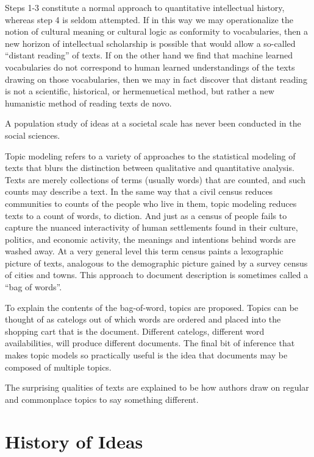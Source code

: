 \documentclass[]{book}
\begin{document}
Steps 1-3 constitute a normal approach to quantitative intellectual
history, whereas step 4 is seldom attempted. If in this way we may
operationalize the notion of cultural meaning or cultural logic as
conformity to vocabularies, then a new horizon of intellectual
scholarship is possible that would allow a so-called ``distant reading''
of texts. If on the other hand we find that machine learned vocabularies
do not correspond to human learned understandings of the texts drawing
on those vocabularies, then we may in fact discover that distant reading
is not a scientific, historical, or hermenuetical method, but rather a
new humanistic method of reading texts de novo.

A population study of ideas at a societal scale has never been conducted
in the social sciences.

Topic modeling refers to a variety of approaches to the statistical
modeling of texts that blurs the distinction between qualitative and
quantitative analysis. Texts are merely collections of terms (usually
words) that are counted, and such counts may describe a text. In the
same way that a civil census reduces communities to counts of the people
who live in them, topic modeling reduces texts to a count of words, to
diction. And just as a census of people fails to capture the nuanced
interactivity of human settlements found in their culture, politics, and
economic activity, the meanings and intentions behind words are washed
away. At a very general level this term census paints a lexographic
picture of texts, analogous to the demographic picture gained by a
survey census of cities and towns. This approach to document description
is sometimes called a ``bag of words''.

To explain the contents of the bag-of-word, topics are proposed. Topics
can be thought of as catelogs out of which words are ordered and placed
into the shopping cart that is the document. Different catelogs,
different word availabilities, will produce different documents. The
final bit of inference that makes topic models so practically useful is
the idea that documents may be composed of multiple topics.

The surprising qualities of texts are explained to be how authors draw
on regular and commonplace topics to say something different.

\chapter{History of Ideas}\label{kd-problem}
\end{document}

